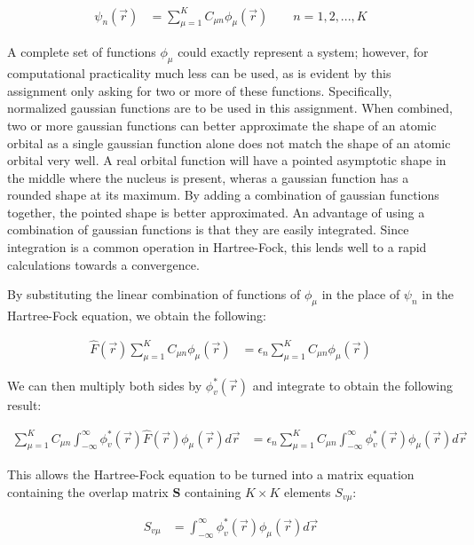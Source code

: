 \documentclass[10pt, oneside, letterpaper]{article}
\begin{document}
\begin{align*}
  \psi_n(\vec{r}) &= \sum_{\mu = 1}^K C_{\mu n}\phi_\mu(\vec{r}) \qquad n = 1, 2, ... , K
\end{align*}

A complete set of functions $\phi_\mu$ could exactly represent a system; however, for computational practicality much less can be used, as is evident by this assignment only asking for two or more of these functions. Specifically, normalized gaussian functions are to be used in this assignment. When combined, two or more gaussian functions can better approximate the shape of an atomic orbital as a single gaussian function alone does not match the shape of an atomic orbital very well. A real orbital function will have a pointed asymptotic shape in the middle where the nucleus is present, wheras a gaussian function has a rounded shape at its maximum. By adding a combination of gaussian functions together, the pointed shape is better approximated. An advantage of using a combination of gaussian functions is that they are easily integrated. Since integration is a common operation in Hartree-Fock, this lends well to a rapid calculations towards a convergence.

By substituting the linear combination of functions of $\phi_\mu$ in the place of $\psi_n$ in the Hartree-Fock equation, we obtain the following:

\begin{align*}
  \hat{F}(\vec{r})\sum_{\mu = 1}^K C_{\mu n}\phi_\mu(\vec{r}) &= \epsilon_n\sum_{\mu = 1}^K C_{\mu n}\phi_\mu(\vec{r})
\end{align*}

We can then multiply both sides by $\phi_v^\ast(\vec{r})$ and integrate to obtain the following result:

\begin{align*}
  \sum_{\mu = 1}^K C_{\mu n} \int_{-\infty}^{\infty} \phi_v^\ast(\vec{r}) \hat{F}(\vec{r}) \phi_\mu(\vec{r})d\vec{r} &= \epsilon_n\sum_{\mu = 1}^K C_{\mu n}\int_{-\infty}^{\infty}\phi_v^\ast(\vec{r})\phi_\mu(\vec{r})d\vec{r}
\end{align*}

This allows the Hartree-Fock equation to be turned into a matrix equation containing the overlap matrix $\bm{S}$ containing $K \times K$ elements $S_{v\mu}$:

\begin{align*}
S_{v\mu} &= \int_{-\infty}^{\infty}\phi_v^\ast(\vec{r})\phi_\mu(\vec{r})d\vec{r}
\end{align*}
\end{document}
